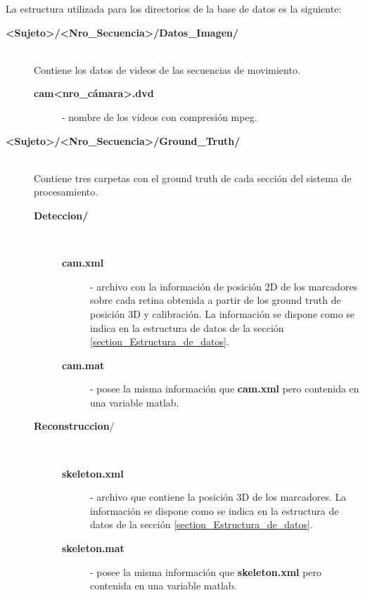 La estructura utilizada para los directorios de la base de datos es la siguiente:
\begin{description}
\item[{\small\textbf{\textsf{<Sujeto>/<Nro\_Secuencia>/Datos\_Imagen/}}}] \hfill \\
Contiene los datos de videos de las secuencias de movimiento.\vspace{-0.2cm}
	\begin{description}
	\item[{\small\textbf{\textsf{cam<nro\_cámara>.dvd}}}] - nombre de los videos con compresión mpeg.
	\end{description} 
\item[{\small\textbf{\textsf{<Sujeto>/<Nro\_Secuencia>/Ground\_Truth/}}}] \hfill \\
Contiene tres carpetas con el ground truth de cada sección del sistema de procesamiento. \vspace{-0.2cm}
	\begin{description}
	\item[{\small\textbf{\textsf{Deteccion/}}}] \hfill \\\vspace{-0.5cm}
		\begin{description}
			\item[{\small\textbf{\textsf{cam.xml}}}] - archivo con la información de posición 2D de los marcadores sobre cada retina obtenida a partir de los ground truth de posición 3D y calibración. La información se dispone como se indica en la estructura de datos de la sección \ref{section_Estructura_de_datos}.   
			\item[{\small\textbf{\textsf{cam.mat}}}] - posee la misma información que {\small\textbf{\textsf{cam.xml}}} pero contenida en una variable matlab.
		\end{description} 			
	\item[{\small\textbf{\textsf{Reconstruccion}}}/] \hfill \\ \vspace{-0.5cm}		
		\begin{description}
			\item[{\small\textbf{\textsf{skeleton.xml}}}] -  archivo que contiene la posición 3D de los marcadores. La información se dispone como se indica en la estructura de datos de la sección \ref{section_Estructura_de_datos}.   
			\item[{\small\textbf{\textsf{skeleton.mat}}}] -  posee la misma información que {\small\textbf{\textsf{skeleton.xml}}} pero contenida en una variable matlab.

\end{description}
\end{description}
\end{description}
